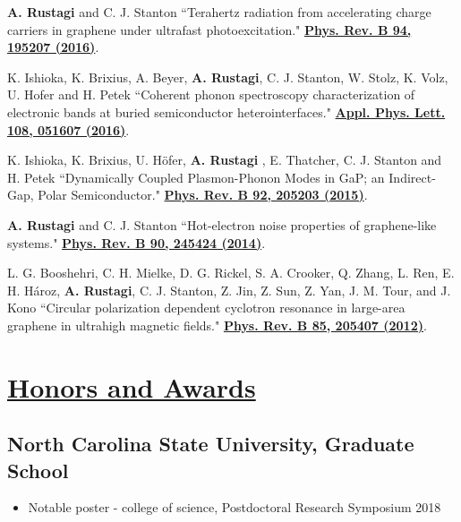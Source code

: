 \documentclass[11pt]{article}
\begin{document}
\begin{etaremune}
			\item {\bf A. Rustagi} and C. J. Stanton  ``Terahertz radiation from accelerating charge carriers in graphene under ultrafast photoexcitation." \href{https://journals.aps.org/prb/abstract/10.1103/PhysRevB.94.195207} {\bf Phys. Rev. B 94, 195207 (2016)}.

      \item K. Ishioka, K. Brixius, A. Beyer, {\bf A. Rustagi}, C. J. Stanton, W. Stolz, K. Volz, U. Hofer and H. Petek ``Coherent phonon spectroscopy characterization of electronic bands at buried semiconductor heterointerfaces." \href{http://scitation.aip.org/content/aip/journal/apl/108/5/10.1063/1.4941397} {\bf Appl. Phys. Lett. 108, 051607 (2016)}.

     \item K. Ishioka, K. Brixius, U. H{\"o}fer, {\bf A. Rustagi} , E. Thatcher, C. J. Stanton and H. Petek ``Dynamically Coupled Plasmon-Phonon Modes in GaP; an Indirect-Gap, Polar Semiconductor." \href{http://journals.aps.org/prb/abstract/10.1103/PhysRevB.92.205203}{\bf Phys. Rev. B 92, 205203 (2015)}.

     \item {\bf A. Rustagi} and C. J. Stanton  ``Hot-electron noise properties of graphene-like systems." \href{http://journals.aps.org/prb/abstract/10.1103/PhysRevB.90.245424}{\bf Phys. Rev. B 90, 245424 (2014)}.

    \item L. G. Booshehri, C. H. Mielke, D. G. Rickel, S. A. Crooker, Q. Zhang, L. Ren, E. H. Hároz, {\bf A. Rustagi}, C. J. Stanton, Z. Jin, Z. Sun, Z. Yan, J. M. Tour, and J. Kono  ``Circular polarization dependent cyclotron resonance in large-area graphene in ultrahigh magnetic fields." \href{http://journals.aps.org/prb/abstract/10.1103/PhysRevB.85.205407} {\bf Phys. Rev. B 85, 205407 (2012)}.

\end{etaremune}


\section*{\underline{Honors and Awards}}
\subsection*{ North Carolina State University, Graduate School}
\begin{itemize}
\itemsep-0.1em
\item Notable poster - college of science, Postdoctoral Research Symposium 2018
\end{itemize}
\end{document}
